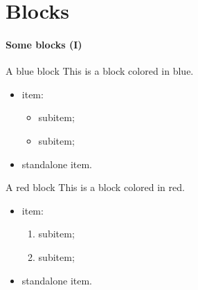 \setcounter{chapter}{1}
\chapter{Blocks}
\label{chap:block}

\begin{frame}
\frametitle{Some blocks (I)}
\begin{block}{A blue block}
This is a block colored in blue.

\begin{itemize}
\item {} item:
\begin{itemize}
\item {} subitem;
\item {} subitem;
\end{itemize}
\item {} standalone item.
\end{itemize}
\end{block}

\begin{alertblock}{A red block}
This is a block colored in red.

\begin{itemize}
\item {} item:
\begin{enumerate}
\item {} subitem;
\item {} subitem;
\end{enumerate}
\item {} standalone item.
\end{itemize}
\end{alertblock}
\end{frame}



